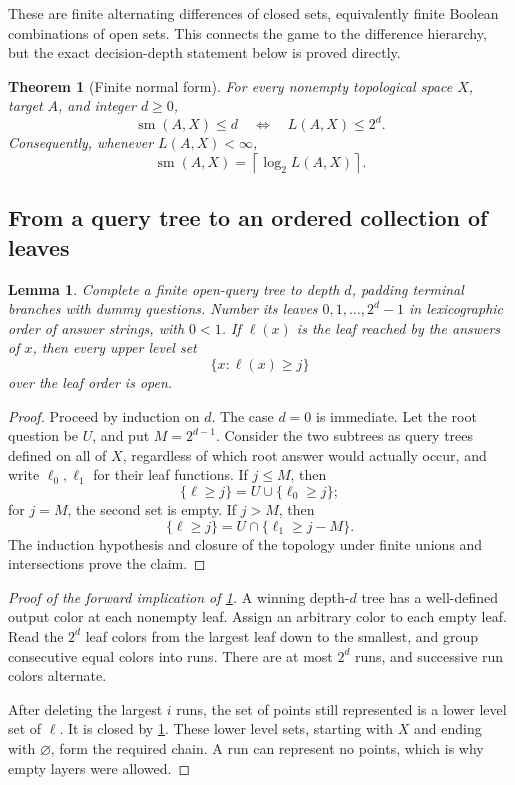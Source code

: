 \documentclass[11pt,letterpaper]{article}
\numberwithin{equation}{section}
\newtheorem{theorem}{Theorem}[section]
\newtheorem{lemma}[lemma]{Lemma}
\theoremstyle{definition}
\theoremstyle{remark}
\theoremstyle{definition}
\newcommand{\sm}{\operatorname{sm}}
\newcommand{\ceil}[1]{\left\lceil#1\right\rceil}
\begin{document}
These are finite alternating differences of closed sets, equivalently finite
Boolean combinations of open sets. This connects the game to the difference
hierarchy, but the exact decision-depth statement below is proved directly.

\begin{theorem}[Finite normal form]\label{thm:normal}
For every nonempty topological space $X$, target $A$, and integer $d\geq0$,
\begin{equation}\label{eq:normal}
 \sm(A,X)\leq d
 \quad\Longleftrightarrow\quad L(A,X)\leq2^d.
\end{equation}
Consequently, whenever $L(A,X)<\infty$,
\begin{equation}\label{eq:logdepth}
 \sm(A,X)=\ceil{\log_2 L(A,X)}.
\end{equation}
\end{theorem}

\subsection{From a query tree to an ordered collection of leaves}

\begin{lemma}\label{lem:leaf}
Complete a finite open-query tree to depth $d$, padding terminal branches with
dummy questions. Number its leaves $0,1,\ldots,2^d-1$ in lexicographic order of
answer strings, with $0<1$. If $\ell(x)$ is the leaf reached by the answers of
$x$, then every upper level set
\[
 \{x:\ell(x)\geq j\}
\]
over the leaf order is open.
\end{lemma}
\begin{proof}
Proceed by induction on $d$. The case $d=0$ is immediate. Let the root question
be $U$, and put $M=2^{d-1}$. Consider the two subtrees as query trees defined on
all of $X$, regardless of which root answer would actually occur, and write
$\ell_0,\ell_1$ for their leaf functions. If $j\leq M$, then
\[
 \{\ell\geq j\}=U\cup\{\ell_0\geq j\};
\]
for $j=M$, the second set is empty. If $j>M$, then
\[
 \{\ell\geq j\}=U\cap\{\ell_1\geq j-M\}.
\]
The induction hypothesis and closure of the topology under finite unions and
intersections prove the claim.
\end{proof}

\begin{proof}[Proof of the forward implication of \cref{thm:normal}]
A winning depth-$d$ tree has a well-defined output color at each nonempty leaf.
Assign an arbitrary color to each empty leaf. Read the $2^d$ leaf colors from
the largest leaf down to the smallest, and group consecutive equal colors into
runs. There are at most $2^d$ runs, and successive run colors alternate.

After deleting the largest $i$ runs, the set of points still represented is a
lower level set of $\ell$. It is closed by \cref{lem:leaf}. These lower level
sets, starting with $X$ and ending with $\varnothing$, form the required chain.
A run can represent no points, which is why empty layers were allowed.
\end{proof}
\end{document}
